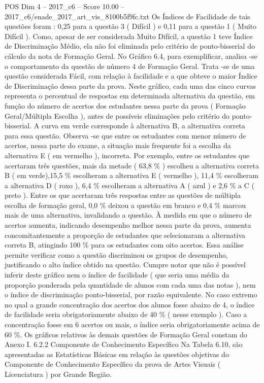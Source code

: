 \begin{textsample}{POS Dim 4 – 2017\_c6 – Score 10.00 – 2017\_c6/enade\_2017\_art\_vis\_8100b5f9fc.txt}
Os Índices de Facilidade de tais questões foram : 0,25 para a questão 3 ( Difícil ) e 0,11 para a questão 1 ( Muito Difícil ).
Como, apesar de ser considerada Muito Difícil, a questão 1 teve Índice de Discriminação Médio, ela não foi eliminada pelo critério de ponto-bisserial do cálculo da nota de Formação Geral.
No Gráfico 6.4, para exemplificar, analisa -se o comportamento da questão de número 4 de Formação Geral.
Trata -se de uma questão considerada Fácil, com relação à facilidade e a que obteve o maior Índice de Discriminação dessa parte da prova.
Neste gráfico, cada uma das cinco curvas representa o percentual de respostas em determinada alternativa da questão, em função do número de acertos dos estudantes nessa parte da prova ( Formação Geral/Múltipla Escolha ), antes de possíveis eliminações pelo critério do ponto-bisserial.
A curva em verde corresponde à alternativa B, a alternativa correta para essa questão.
Observa -se que entre os estudantes com menor número de acertos, nessa parte do exame, a situação mais frequente foi a escolha da alternativa E ( em vermelho ), incorreta.
Por exemplo, entre os estudantes que acertaram três questões, mais da metade ( 63,8 \% ) escolheu a alternativa correta B ( em verde),15,5 \% escolheram a alternativa E ( vermelho ), 11,4 \% escolheram a alternativa D ( roxo ), 6,4 \% escolheram a alternativa A ( azul ) e 2,6 \% a C ( preto ).
Entre os que acertaram três respostas entre as questões de múltipla escolha de formação geral, 0,0 \% deixou a questão em branco e 0,4 \% marcou mais de uma alternativa, invalidando a questão.
À medida em que o número de acertos aumenta, indicando desempenho melhor nessa parte da prova, aumenta concomitantemente a proporção de estudantes que selecionaram a alternativa correta B, atingindo 100 \% para os estudantes com oito acertos.
Essa análise permite verificar como a questão discriminou os grupos de desempenho, justificando o alto índice obtido na questão.
Cumpre notar que não é possível inferir deste gráfico nem o índice de facilidade ( que seria uma média da proporção ponderada pela quantidade de alunos com cada uma das notas ), nem o índice de discriminação ponto-bisserial, por razão equivalente.
No caso extremo no qual a grande concentração dos acertos dos alunos fosse abaixo de 4, o índice de facilidade seria obrigatoriamente abaixo de 40 \% ( nesse exemplo ).
Caso a concentração fosse em 6 acertos ou mais, o índice seria obrigatoriamente acima de 60 \%.
Os gráficos relativos às demais questões de Formação Geral constam do Anexo I. 6.2.2 Componente de Conhecimento Específico Na Tabela 6.10, são apresentadas as Estatísticas Básicas em relação às questões objetivas do Componente de Conhecimento Específico da prova de Artes Visuais ( Licenciatura ) por Grande Região.

\end{textsample}
